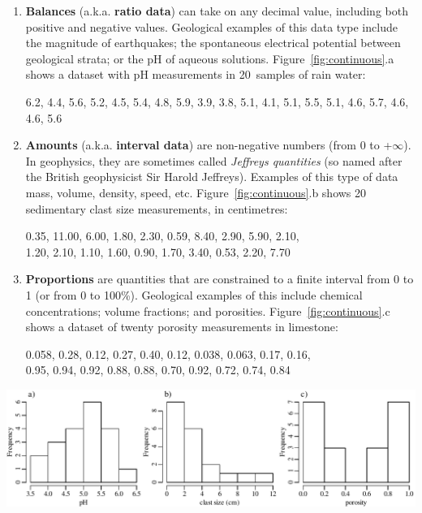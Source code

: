 \begin{enumerate}
\item\textbf{Balances} (a.k.a. \textbf{ratio data}) can take on any
  decimal value, including both positive and negative
  values. Geological examples of this data type include the magnitude
  of earthquakes; the spontaneous electrical potential between
  geological strata; or the pH of aqueous
  solutions. Figure~\ref{fig:continuous}.a shows a dataset with pH
  measurements in 20~samples of rain water:
  \begin{center}
    6.2, 4.4, 5.6, 5.2, 4.5, 5.4, 4.8, 5.9, 3.9, 3.8, 5.1, 4.1, 5.1, 5.5,
    5.1, 4.6, 5.7, 4.6, 4.6, 5.6
  \end{center}
\item\textbf{Amounts} (a.k.a. \textbf{interval data}) are non-negative
  numbers (from 0 to +$\infty$).  In geophysics, they are sometimes
  called \emph{Jeffreys quantities} (so named after the British
  geophysicist Sir Harold Jeffreys). Examples of this type of data
  mass, volume, density, speed, etc. Figure~\ref{fig:continuous}.b
  shows 20 sedimentary clast size measurements, in centimetres:
  \begin{center}
    0.35, 11.00, 6.00, 1.80, 2.30, 0.59, 8.40, 2.90, 5.90, 2.10,\\
    1.20, 2.10, 1.10, 1.60, 0.90, 1.70, 3.40, 0.53, 2.20, 7.70
  \end{center}
\item\textbf{Proportions} are quantities that are constrained to a
  finite interval from 0 to 1 (or from 0 to 100\%). Geological
  examples of this include chemical concentrations; volume fractions;
  and porosities.  Figure~\ref{fig:continuous}.c shows a dataset of
  twenty porosity measurements in limestone:
  \begin{center}
    0.058, 0.28, 0.12, 0.27, 0.40, 0.12, 0.038, 0.063, 0.17, 0.16,\\
    0.95, 0.94, 0.92, 0.88, 0.88, 0.70, 0.92, 0.72, 0.74, 0.84
  \end{center}
\end{enumerate}

\noindent\includegraphics[width=\textwidth]{../figures/continuous.pdf}\medskip
\begingroup {}
\label{fig:continuous}
\endgroup

